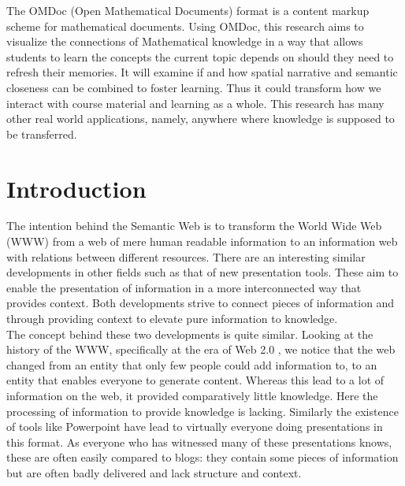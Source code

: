 \documentclass[twoside]{article}
\begin{document}
The OMDoc (Open Mathematical Documents) format \cite{Kohlhase:OMDoc1.2} is a content markup scheme for mathematical documents. Using OMDoc, this research aims to visualize the connections of Mathematical knowledge in a way that allows students to learn the concepts the current topic depends on should they need to refresh their memories. It will examine if and how spatial narrative and semantic closeness can be combined to foster learning. Thus it could transform how we interact with course material and learning as a whole. This research has many other real world applications, namely, anywhere where knowledge is supposed to be transferred.\\ 

  \newpage
  \tableofcontents

  \clearpage

  \section{Introduction}

The intention behind the Semantic Web \cite{BernersLee:tsw98} is to transform the World Wide Web (WWW) from a web of mere human readable information to an information web with relations between different resources. There are an interesting similar developments in other fields such as that of new presentation tools. These aim to enable the presentation of information in a more interconnected way that provides context. Both developments strive to connect pieces of information and through providing context to elevate pure information to knowledge.\\

The concept behind these two developments is quite similar. Looking at the history of the WWW, specifically at the era of Web 2.0 \cite{Weller:npentrel14}, we notice that the web changed from an entity that only few people could add information to, to an entity that enables everyone to generate content. Whereas this lead to a lot of information on the web, it provided comparatively little knowledge. Here the processing of information to provide knowledge is lacking. Similarly the existence of tools like Powerpoint have lead to virtually everyone doing presentations in this format. As everyone who has witnessed many of these presentations knows, these are often easily compared to blogs: they contain some pieces of information but are often badly delivered and lack structure and context. \\
\end{document}
